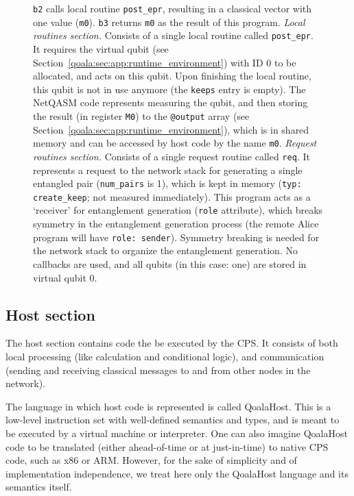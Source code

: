 \begin{figure}[ht]
{    \texttt{b2} calls local routine \texttt{post\_epr}, resulting in a classical vector with one value (\texttt{m0}).
    \texttt{b3} returns \texttt{m0} as the result of this program.
    \textit{Local routines section.} Consists of a single local routine called \texttt{post\_epr}.
    It requires the virtual qubit (see Section~\ref{qoala:sec:app:runtime_environment}) with ID 0 to be allocated, and acts on this qubit.
    Upon finishing the local routine, this qubit is not in use anymore (the \texttt{keeps} entry is empty).
    The NetQASM code represents measuring the qubit, and then storing the result (in register \texttt{M0}) to the \texttt{@output} array (see Section~\ref{qoala:sec:app:runtime_environment}), which is in shared memory and can be accessed by host code by the name \texttt{m0}.
    \textit{Request routines section.} Consists of a single request routine called \texttt{req}.
    It represents a request to the network stack for generating a single entangled pair (\texttt{num\_pairs} is 1), which is kept in memory (\texttt{typ: create\_keep}; not measured immediately).
    This program acts as a `receiver' for entanglement generation (\texttt{role} attribute), which breaks symmetry in the entanglement generation process (the remote Alice program will have \texttt{role: sender}). Symmetry breaking is needed for the network stack to organize the entanglement generation.
    No callbacks are used, and all qubits (in this case: one) are stored in virtual qubit 0.
    }
    \label{qoala:fig:app:example_full_program}
\end{figure}

\subsection{Host section}
The host section contains code the be executed by the CPS.
It consists of both local processing (like calculation and conditional logic), and
communication (sending and receiving classical messages to and from other nodes in the network).

The language in which host code is represented is called QoalaHost.
This is a low-level instruction set with well-defined semantics and types,
and is meant to be executed by a virtual machine or interpreter.
One can also imagine QoalaHost code to be translated (either ahead-of-time or at just-in-time) to native CPS code, such as x86 or ARM. However, for the sake of simplicity and of implementation independence, we treat here only the QoalaHost language and its semantics itself.

